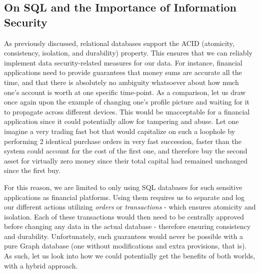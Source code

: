 \documentclass[10pt,        %
               a4paper,     %
               journal,     %
               ]{IEEEtran}
\begin{document}
\subsection{On SQL and the Importance of Information Security}
As previously discussed, relational databases support the ACID (atomicity, consistency, isolation, and durability) property. This ensures that we can reliably implement data security-related measures for our data. For instance, financial applications need to provide guarantees that money sums are accurate all the time, and that there is absolutely no ambiguity whatsoever about how much one's account is worth at one specific time-point. As a comparison, let us draw once again upon the example of changing one's profile picture and waiting for it to propagate across different devices. This would be unacceptable for a financial application since it could potentially allow for tampering and abuse. Let one imagine a very trading fast bot that would capitalize on such a loophole by performing 2 identical purchase orders in very fast succession, faster than the system could account for the cost of the first one, and therefore buy the second asset for virtually zero money since their total capital had remained unchanged since the first buy. \par
For this reason, we are limited to only using SQL databases for such sensitive applications as financial platforms. Using them requires us to separate and log our different actions utilizing \textit{orders} or \textit{transactions} - which ensures atomicity and isolation. Each of these transactions would then need to be centrally approved before changing any data in the actual database - therefore ensuring consistency and durability. Unfortunately, such guarantees would never be possible with a pure Graph database (one without modifications and extra provisions, that is). As such, let us look into how we could potentially get the benefits of both worlds, with a hybrid approach.\par
\end{document}
